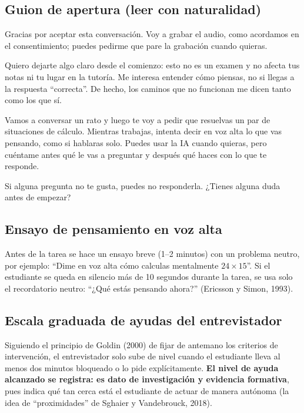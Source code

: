 \documentclass[11pt,letterpaper]{article}
\newcounter{preg}
\begin{document}
\subsection{Guion de apertura (leer con naturalidad)}
\begin{guion}
Gracias por aceptar esta conversación. Voy a grabar el audio, como acordamos en el consentimiento; puedes pedirme que pare la grabación cuando quieras.

Quiero dejarte algo claro desde el comienzo: esto no es un examen y no afecta tus notas ni tu lugar en la tutoría. Me interesa entender cómo piensas, no si llegas a la respuesta ``correcta''. De hecho, los caminos que no funcionan me dicen tanto como los que sí.

Vamos a conversar un rato y luego te voy a pedir que resuelvas un par de situaciones de cálculo. Mientras trabajas, intenta decir en voz alta lo que vas pensando, como si hablaras solo. Puedes usar la IA cuando quieras, pero cuéntame antes qué le vas a preguntar y después qué haces con lo que te responde.

Si alguna pregunta no te gusta, puedes no responderla. ¿Tienes alguna duda antes de empezar?
\end{guion}

\subsection{Ensayo de pensamiento en voz alta}
Antes de la tarea se hace un ensayo breve (1--2 minutos) con un problema neutro, por ejemplo: ``Dime en voz alta cómo calculas mentalmente $24\times 15$''. Si el estudiante se queda en silencio más de 10 segundos durante la tarea, se usa solo el recordatorio neutro: ``¿Qué estás pensando ahora?'' (Ericsson y Simon, 1993).

\subsection{Escala graduada de ayudas del entrevistador}\label{sec:ayudas}
Siguiendo el principio de Goldin (2000) de fijar de antemano los criterios de intervención, el entrevistador solo sube de nivel cuando el estudiante lleva al menos dos minutos bloqueado o lo pide explícitamente. \textbf{El nivel de ayuda alcanzado se registra: es dato de investigación y evidencia formativa}, pues indica qué tan cerca está el estudiante de actuar de manera autónoma (la idea de ``proximidades'' de Sghaier y Vandebrouck, 2018).
\end{document}
